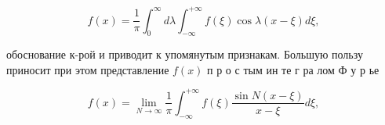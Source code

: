 \documentclass[10pt]{article}
\begin{document}
\[

f(x)=\frac{1}{\pi} \int_{0}^{\infty} d \lambda \int_{-\infty}^{+\infty} f(\xi) \cos \lambda(x-\xi) d \xi,

\]



обоснование к-рой и приводит к упомянутым признакам. Большую пользу приносит при этом представление $f(x)$ п р о с тым ин те г ра лом Ф у р ье



\[

f(x)=\lim _{N \rightarrow \infty} \frac{1}{\pi} \int_{-\infty}^{+\infty} f(\xi) \frac{\sin N(x-\xi)}{x-\xi} d \xi,

\]
\end{document}
